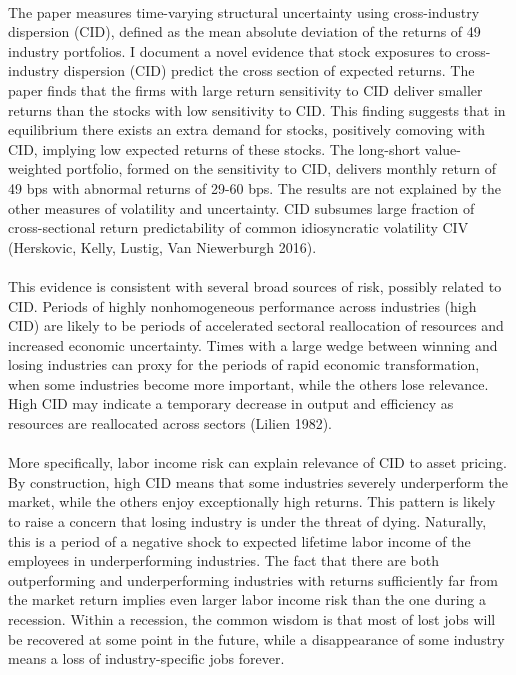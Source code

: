 \documentclass[12pt]{article}
\begin{document}
\paragraph{}
The paper measures time-varying structural uncertainty using cross-industry dispersion (CID), defined as the mean absolute deviation of the returns of 49 industry portfolios. I document a novel evidence that stock exposures to cross-industry dispersion (CID) predict the cross section of expected returns. The paper finds that the firms with large return sensitivity to CID deliver smaller returns than the stocks with low sensitivity to CID. This finding suggests that in equilibrium there exists an extra demand for stocks, positively comoving with CID, implying low expected returns of these stocks. The long-short value-weighted portfolio, formed on the sensitivity to CID, delivers monthly return of 49 bps with abnormal returns of 29-60 bps. The results are not explained by the other measures of volatility and uncertainty. CID subsumes large fraction of cross-sectional return predictability of common idiosyncratic volatility CIV (Herskovic, Kelly, Lustig, Van Niewerburgh 2016). 
\paragraph{}
This evidence is consistent with several broad sources of risk, possibly related to CID. Periods of highly nonhomogeneous performance across industries (high CID) are likely to be periods of accelerated sectoral reallocation of resources and increased economic uncertainty. Times with a large wedge between winning and losing industries can proxy for the periods of rapid economic transformation, when some industries become more important, while the others lose relevance. High CID may indicate a temporary decrease in output and efficiency as resources are reallocated across sectors (Lilien 1982). 
\paragraph{}
More specifically, labor income risk can explain relevance of CID to asset pricing. By construction, high CID means that some industries severely underperform the market, while the others enjoy exceptionally high returns. This pattern is likely to raise a concern that losing industry is under the threat of dying. Naturally, this is a period of a negative shock to expected lifetime labor income of the employees in underperforming industries. The fact that there are both outperforming and underperforming industries with returns sufficiently far from the market return implies even larger labor income risk than the one during a recession. Within a recession, the common wisdom is that most of lost jobs will be recovered at some point in the future, while a disappearance of some industry means a loss of industry-specific jobs forever. 
\end{document}
